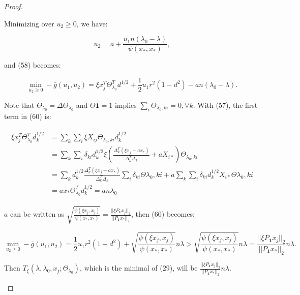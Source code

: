 \documentclass{article}
\begin{document}
\begin{proof}
\begin{enumerate}
    Minimizing over $u_2\geq 0$, we have:
    
    \begin{equation}
        u_2=a+\frac{u_1n(\lambda_0-\lambda)}{\psi(x_*,x_*)},
    \end{equation}
    
    and (58) becomes:
    
    \begin{equation}
        \min_{u_2\geq0}-\bar{g}(u_1,u_2)=\xi x_j^T\Theta_{\lambda_0}^Td^{1/2}+\frac{1}{2}u_1r^2(1-d^2)-an(\lambda_0-\lambda).
    \end{equation}
    
    Note that $\Theta_{\lambda_0}=\Delta\Theta_{\lambda_0}$ and $\Theta\mathbf{1}=1$ implies $\sum_i\Theta_{\lambda_0,ki}=0,\forall k$. With (57), the first term in (60) is:
    
    \begin{gather}
        \begin{aligned}
            \xi x_j^T\Theta_{\lambda_0}^Td_k^{1/2}&=\sum_k\sum_i\xi X_{ij}\Theta_{\lambda_0,ki}d_k^{1/2}\\
            &=\sum_k\sum_i \delta_{ki}d_k^{1/2}\xi \left(\frac{\Delta_k^T(\xi x_j-ax_*)}{\Delta_k^T\Delta_k}+aX_{i*}\right)\Theta_{\lambda_0,ki}\\
            &=\sum_kd_k^{1/2}\frac{\Delta_k^T(\xi x_j-ax_*)}{\Delta_k^T\Delta_k}\sum_i\delta_{ki}\Theta{\lambda_0,ki}+a\sum_k\sum_i\delta_{ki}d_k^{1/2}X_{i*}\Theta{\lambda_0,ki}\\
            &=ax_*\Theta_{\lambda_0}^Td_k^{1/2}=an\lambda_0
        \end{aligned}
    \end{gather}
    
    $a$ can be written as $\sqrt{\frac{\psi(\xi x_j,x_j)}{\psi(x_*,x_*)}}=\frac{||\xi P_\mathbf{1}x_j||_2}{||P_\mathbf{1}x_*||_2}$, then (60) becomes:
    
    \begin{equation}
        \min_{u_2\geq0}-\bar{g}(u_1,u_2)=\frac{1}{2}u_1r^2(1-d^2)+\sqrt{\frac{\psi(\xi x_j,x_j)}{\psi(x_*,x_*)}}n\lambda>\sqrt{\frac{\psi(\xi x_j,x_j)}{\psi(x_*,x_*)}}n\lambda=\frac{||\xi P_\mathbf{1}x_j||_2}{||P_\mathbf{1}x_*||_2}n\lambda.
    \end{equation}
    
    Then $T_\xi(\lambda,\lambda_0,x_j;\Theta_{\lambda_0})$, which is the minimal of (29), will be $\frac{||\xi P_\mathbf{1}x_j||_2}{||P_\mathbf{1}x_*||_2}n\lambda$. 
\end{enumerate}

\end{proof}
\fi
\end{document}
